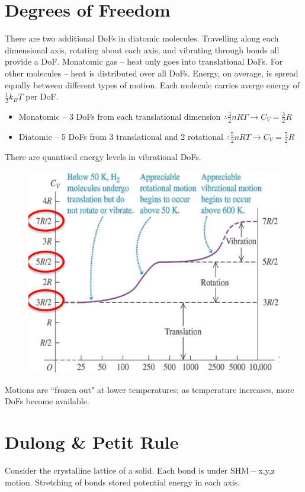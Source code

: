 \documentclass[a4paper, 11pt, normalem]{report}
\begin{document}
\section{Degrees of Freedom}
There are two additional DoFs in diatomic molecules.
Travelling along each dimensional axis, rotating about each axis, and vibrating through bonds all provide a DoF.
Monatomic gas -- heat only goes into translational DoFs.
For other molecules -- heat is distributed over all DoFs.
Energy, on average, is spread equally between different types of motion.
Each molecule carries averge energy of $\frac{1}{2}k_{B}T$ per DoF.
\begin{itemize}
    \item Monatomic -- 3 DoFs from each translational dimension $\therefore \frac{3}{2}nRT \rightarrow C_{V} = \frac{3}{2}R$
    \item Diatomic -- 5 DoFs from 3 translational and 2 rotational $\therefore \frac{5}{2}nRT \rightarrow C_{V} = \frac{5}{2}R$
\end{itemize}
There are quantised energy levels in vibrational DoFs.
\begin{figure}[H]
    \centering
    \includegraphics[scale=0.8]{Vibration.jpg}
\end{figure}
Motions are ``frozen out" at lower temperatures; as temperature increases, more DoFs become available.

\section{Dulong \& Petit Rule}
Consider the crystalline lattice of a solid.
Each bond is under SHM -- x,y,z motion.
Stretching of bonds stored potential energy in each axis.
\end{document}
